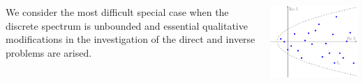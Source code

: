 \documentclass[blockverticalspace=25mm,colspace=25mm,25pt]{tikzposter} %
\begin{document}
\begin{columns}
{%
We consider the most difficult special case when
the discrete spectrum is unbounded and essential qualitative modifications in the investigation of the direct and inverse problems are arised. 
\begin{tikzfigure}
\includegraphics[scale=3]{spectra.pdf}
\end{tikzfigure}
}



\end{columns}
\end{document}
